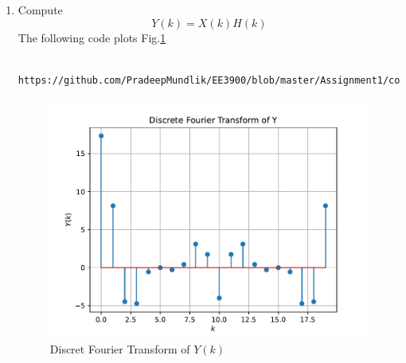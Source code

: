 \documentclass[journal,12pt,twocolumn]{IEEEtran}
\renewcommand\thesection{\arabic{section}}
\begin{document}
\begin{enumerate}[label=\thesection.\arabic*]
\item Compute 
\begin{equation}
Y(k) = X(k)H(k)
\end{equation}
\solution
The following code plots Fig.\ref{fig:6.2}
\begin{lstlisting}
     https://github.com/PradeepMundlik/EE3900/blob/master/Assignment1/codes/q6/6.2.py
\end{lstlisting}
\begin{figure}[!ht]
     \centering
     \includegraphics[width=\columnwidth]{figs/q6/6.2.pdf}
     \caption{Discret Fourier Transform of $Y(k)$}
     \label{fig:6.2}
\end{figure}


\end{enumerate}
\end{document}
